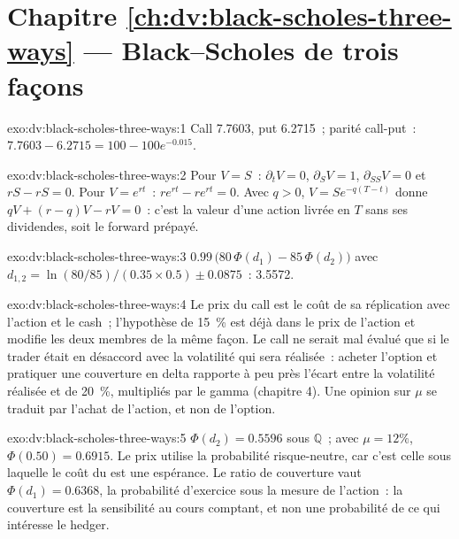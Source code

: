 \section*{Chapitre \ref{ch:dv:black-scholes-three-ways} --- Black--Scholes de trois façons}

\begin{solution}{exo:dv:black-scholes-three-ways:1}
Call 7.7603, put 6.2715~; parité call-put~: $7.7603-6.2715=100-100e^{-0.015}$.
\end{solution}

\begin{solution}{exo:dv:black-scholes-three-ways:2}
Pour $V=S$~: $\partial_tV=0$, $\partial_SV=1$, $\partial_{SS}V=0$ et $rS-rS=0$. Pour
$V=e^{rt}$~: $re^{rt}-re^{rt}=0$. Avec $q>0$, $V=Se^{-q(T-t)}$ donne
$qV+(r-q)V-rV=0$~: c'est la valeur d'une action livrée en $T$ sans ses
dividendes, soit le forward prépayé.
\end{solution}

\begin{solution}{exo:dv:black-scholes-three-ways:3}
$0.99\,\bigl(80\,\Phi(d_1)-85\,\Phi(d_2)\bigr)$ avec
$d_{1,2}=\ln(80/85)/(0.35\times0.5)\pm0.0875$~: 3.5572.
\end{solution}

\begin{solution}{exo:dv:black-scholes-three-ways:4}
Le prix du call est le coût de sa réplication avec l'action et le cash~; l'hypothèse de 15~\%
est déjà dans le prix de l'action et modifie les deux membres de la même façon. Le call
ne serait mal évalué que si le trader était en désaccord avec la volatilité qui sera
réalisée~: acheter l'option et pratiquer une couverture en delta rapporte à peu près l'écart entre
la volatilité réalisée et de 20~\%, multipliés par le gamma (chapitre 4). Une opinion sur $\mu$ se
traduit par l'achat de l'action, et non de l'option.
\end{solution}

\begin{solution}{exo:dv:black-scholes-three-ways:5}
$\Phi(d_2)=0.5596$ sous $\mathbb Q$~; avec $\mu=12\%$, $\Phi(0.50)=0.6915$. Le prix
utilise la probabilité risque-neutre, car c'est celle sous laquelle le
coût du  est une espérance. Le ratio de couverture vaut $\Phi(d_1)=0.6368$, la
probabilité d'exercice sous la mesure de l'action~: la couverture est la sensibilité au
cours comptant, et non une probabilité de ce qui intéresse le hedger.
\end{solution}

